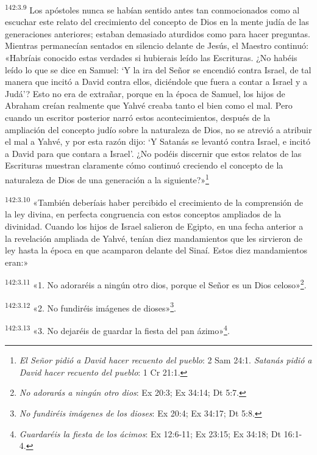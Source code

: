\par
\textsuperscript{142:3.9} Los apóstoles nunca se habían sentido antes tan conmocionados como al escuchar este relato del crecimiento del concepto de Dios en la mente judía de las generaciones anteriores; estaban demasiado aturdidos como para hacer preguntas. Mientras permanecían sentados en silencio delante de Jesús, el Maestro continuó: «Habríais conocido estas verdades si hubierais leído las Escrituras. ¿No habéis leído lo que se dice en Samuel: `Y la ira del Señor se encendió contra Israel, de tal manera que incitó a David contra ellos, diciéndole que fuera a contar a Israel y a Judá'? Esto no era de extrañar, porque en la época de Samuel, los hijos de Abraham creían realmente que Yahvé creaba tanto el bien como el mal. Pero cuando un escritor posterior narró estos acontecimientos, después de la ampliación del concepto judío sobre la naturaleza de Dios, no se atrevió a atribuir el mal a Yahvé, y por esta razón dijo: `Y Satanás se levantó contra Israel, e incitó a David para que contara a Israel'. ¿No podéis discernir que estos relatos de las Escrituras muestran claramente cómo continuó creciendo el concepto de la naturaleza de Dios de una generación a la siguiente?»\footnote{\textit{El Señor pidió a David hacer recuento del pueblo}: 2 Sam 24:1. \textit{Satanás pidió a David hacer recuento del pueblo}: 1 Cr 21:1.}

\par
\textsuperscript{142:3.10} «También deberíais haber percibido el crecimiento de la comprensión de la ley divina, en perfecta congruencia con estos conceptos ampliados de la divinidad. Cuando los hijos de Israel salieron de Egipto, en una fecha anterior a la revelación ampliada de Yahvé, tenían diez mandamientos que les sirvieron de ley hasta la época en que acamparon delante del Sinaí. Estos diez mandamientos eran:»

\par
\textsuperscript{142:3.11} «1. No adoraréis a ningún otro dios, porque el Señor es un Dios celoso»\footnote{\textit{No adorarás a ningún otro dios}: Ex 20:3; Ex 34:14; Dt 5:7.}.

\par
\textsuperscript{142:3.12} «2. No fundiréis imágenes de dioses»\footnote{\textit{No fundiréis imágenes de los dioses}: Ex 20:4; Ex 34:17; Dt 5:8.}.

\par
\textsuperscript{142:3.13} «3. No dejaréis de guardar la fiesta del pan ázimo»\footnote{\textit{Guardaréis la fiesta de los ácimos}: Ex 12:6-11; Ex 23:15; Ex 34:18; Dt 16:1-4.}.

